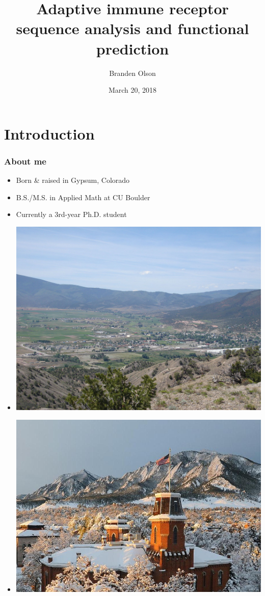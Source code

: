 \documentclass[mathserif,compress]{beamer}
\title[]{Adaptive immune receptor sequence analysis and functional prediction}
\author[]
{Branden Olson}
\date[March 20, 2018]
{March 20, 2018}
\institute[]
{
Fred Hutchinson Cancer Research Center
}
\renewcommand\;{\,}
\begin{document}
\begin{frame}[noframenumbering]
  \titlepage
\end{frame}

\section{Introduction}

\begin{frame}\frametitle{About me}
\begin{center}
\begin{minipage}{0.49\linewidth}
\begin{itemize}
\bigskip
\item Born \& raised in Gypsum, Colorado
\bigskip
\item B.S./M.S. in Applied Math at CU Boulder
\bigskip
\item Currently a 3rd-year Ph.D. student
\end{itemize}
\end{minipage}
\begin{minipage}{0.49\linewidth}
\begin{itemize}
\item[]
\includegraphics[width=\linewidth]{Images/Gypsum.jpg}
\bigskip
\item[]
\begin{center}
\includegraphics[width=\linewidth]{Images/Boulder.jpg}

\end{center}
\end{itemize}
\end{minipage}
\end{center}
\end{frame}
\end{document}
